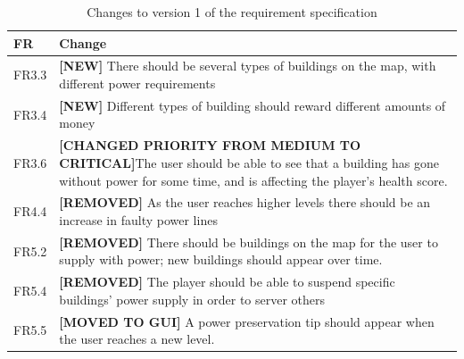 	\begin{table}[H]
	\begin{tabular}{| p{1.5cm} | p{12cm} |}
		\hline
		\rowcolor{lightgray}
		{\bf FR} & {\bf Change} \\ \hline
		FR3.3 & {\bf \color{green} [NEW]} There should be several types of buildings on the map, 
		with different power requirements  \\ \hline
		FR3.4 & {\bf \color{green} [NEW]} Different types of building should reward different amounts of 
		money \\ \hline
		FR3.6 & {\bf \color{orange} [CHANGED PRIORITY FROM MEDIUM TO CRITICAL]}The user should be able to see that a building has gone without power for some time, and is affecting the player's health score. \\ \hline
		FR4.4 & {\bf \color{red} [REMOVED]} As the user reaches higher levels there should be an 
		increase in faulty power lines \\ \hline
		FR5.2 & {\bf \color{red} [REMOVED]} There should be buildings on the map for the user to 
		supply with power; new buildings should appear over time. \\ \hline
		FR5.4 & {\bf \color{red} [REMOVED]} The player should be able to suspend specific buildings' 
		power supply in order to server others \\ \hline
		FR5.5 & {\bf \color{orange} [MOVED TO GUI]} A power preservation tip should appear when the 
		user reaches a new level. \\ \hline
	\end{tabular}
	\caption{Changes to version 1 of the requirement specification}
	\label{table:reqspec1}
	\end{table}

